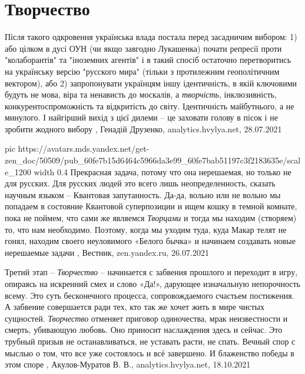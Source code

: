  
 
 
 
 
\chapter{Творчество}
\label{sec:slova.tvorchestvo}

Після такого одкровення українська влада постала перед засадничим вибором: 1)
або цілком в дусі ОУН (чи якщо завгодно Лукашенка) почати репресії проти
"колаборантів" та "іноземних агентів" і в такий спосіб остаточно перетворитись
на українську версію "русского мира" (тільки з протилежним геополітичним
вектором), або 2) запропонувати українцям іншу ідентичність, в якій ключовими
будуть не мова, віра та ненависть до москалів, а \emph{творчість},
інклюзивність, конкурентоспроможність та відкритість до світу. Ідентичність
майбутнього, а не минулого.  І найгірший вихід з цієї дилеми – це заховати
голову в пісок і не зробити жодного вибору
, 
Генадій Друзенко, analytics.hvylya.net, 28.07.2021

\ifcmt
  pic https://avatars.mds.yandex.net/get-zen_doc/50509/pub_60fe7b15d6464c5966da3e99_60fe7bab51197c3f2183635e/scale_1200
  width 0.4
\fi
Прекрасная задача, потому что она нерешаемая, но только не для русских. Для
русских людей это всего лишь неопределенность, сказать научным языком –
Квантовая запутанность. Да-да, вольно или не вольно мы попадаем в состояние
Квантовой суперпозиции и ищем кошку в темной комнате, пока не поймем, что сами
же являемся \emph{Творцами} и тогда мы находим (створяем) то, что нам необходимо.
Поэтому, когда мы уходим туда, куда Макар телят не гонял, находим своего
неуловимого «Белого бычка» и начинаем создавать новые нерешаемые задачи
, Вестник, zen.yandex.ru, 26.07.2021 

Третий этап – \emph{Творчество} – начинается с забвения прошлого и переходит в игру,
опираясь на искренний смех и слово «Да!», дарующее изначальную непорочность
всему. Это суть бесконечного процесса, сопровождаемого счастьем постижения. А
забвение совершается ради тех, кто так же хочет жить в мире чистых сущностей.
\emph{Творчество} отменяет приговор одиночества, мрак неизвестности и смерть,
убивающую любовь. Оно приносит наслаждения здесь и сейчас. Это трубный призыв
не останавливаться, не уставать расти, не спать. Вечный спор с мыслью о том,
что все уже состоялось и всё завершено. И блаженство победы в этом споре
, 
Акулов-Муратов В. В., analytics.hvylya.net, 18.10.2021
